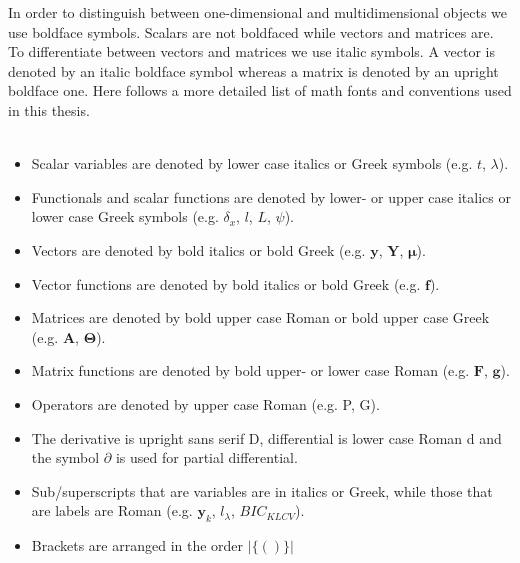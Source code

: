 
\begin{notation}

In order to distinguish between one-dimensional and multidimensional objects we use
boldface symbols. Scalars are not boldfaced while vectors and matrices are. To differentiate
between vectors and matrices we use italic symbols. A vector is denoted by an
italic boldface symbol whereas a matrix is denoted by an upright boldface one. Here
follows a more detailed list of math fonts and conventions used in this thesis.
\\
\\
\begin{itemize}
\item Scalar variables are denoted by lower case italics or Greek symbols (e.g. $t$, $\lambda$).
\item Functionals and scalar functions are denoted by lower- or upper case italics or
lower case Greek symbols (e.g. $\delta_x$, $l$, $L$, $\psi$).
\item Vectors are denoted by bold italics or bold Greek (e.g. $\mathbf{y}$, $\mathbf{Y}$, $\boldsymbol{\mu}$).
\item Vector functions are denoted by bold italics or bold Greek (e.g. $\mathbf{f}$).
\item Matrices are denoted by bold upper case Roman or bold upper case Greek (e.g. $\mathbf{A}$, $\boldsymbol{\Theta}$).
\item Matrix functions are denoted by bold upper- or lower case Roman (e.g. $\mathbf{F}$, $\mathbf{g}$).
\item Operators are denoted by upper case Roman (e.g. P, G).
\item The derivative is upright sans serif D, differential is lower case Roman d and the
symbol $\partial$ is used for partial differential.
\item Sub/superscripts that are variables are in italics or Greek, while those that are
labels are Roman (e.g. $\mathbf{y}_k$, $l_{\lambda}$, $BIC_{KLCV}$).
\item Brackets are arranged in the order $|\{()\}|$

\end{itemize}


\end{notation}

